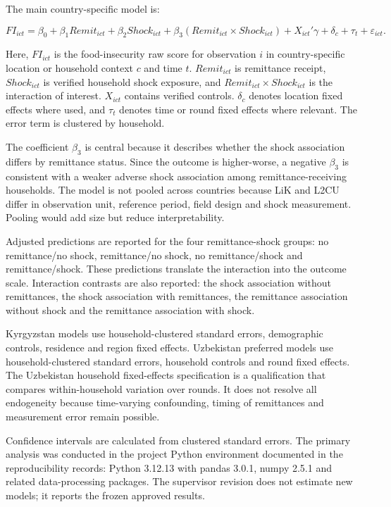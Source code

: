 \documentclass[11pt]{article}
\begin{document}
The main country-specific model is:

\begin{equation}
FI_{ict}
=
\beta_0
+
\beta_1 Remit_{ict}
+
\beta_2 Shock_{ict}
+
\beta_3
\left(
Remit_{ict}\times Shock_{ict}
\right)
+
X_{ict}'\gamma
+
\delta_c
+
\tau_t
+
\varepsilon_{ict}.
\label{eq:main}
\end{equation}

Here, \(FI_{ict}\) is the food-insecurity raw score for observation \(i\) in country-specific location or household context \(c\) and time \(t\). \(Remit_{ict}\) is remittance receipt, \(Shock_{ict}\) is verified household shock exposure, and \(Remit_{ict} \times Shock_{ict}\) is the interaction of interest. \(X_{ict}\) contains verified controls. \(\delta_c\) denotes location fixed effects where used, and \(\tau_t\) denotes time or round fixed effects where relevant. The error term is clustered by household.

The coefficient \(\beta_3\) is central because it describes whether the shock association differs by remittance status. Since the outcome is higher-worse, a negative \(\beta_3\) is consistent with a weaker adverse shock association among remittance-receiving households. The model is not pooled across countries because LiK and L2CU differ in observation unit, reference period, field design and shock measurement. Pooling would add size but reduce interpretability.

Adjusted predictions are reported for the four remittance-shock groups: no remittance/no shock, remittance/no shock, no remittance/shock and remittance/shock. These predictions translate the interaction into the outcome scale. Interaction contrasts are also reported: the shock association without remittances, the shock association with remittances, the remittance association without shock and the remittance association with shock.

Kyrgyzstan models use household-clustered standard errors, demographic controls, residence and region fixed effects. Uzbekistan preferred models use household-clustered standard errors, household controls and round fixed effects. The Uzbekistan household fixed-effects specification is a qualification that compares within-household variation over rounds. It does not resolve all endogeneity because time-varying confounding, timing of remittances and measurement error remain possible.

Confidence intervals are calculated from clustered standard errors. The primary analysis was conducted in the project Python environment documented in the reproducibility records: Python 3.12.13 with pandas 3.0.1, numpy 2.5.1 and related data-processing packages. The supervisor revision does not estimate new models; it reports the frozen approved results.
\end{document}
